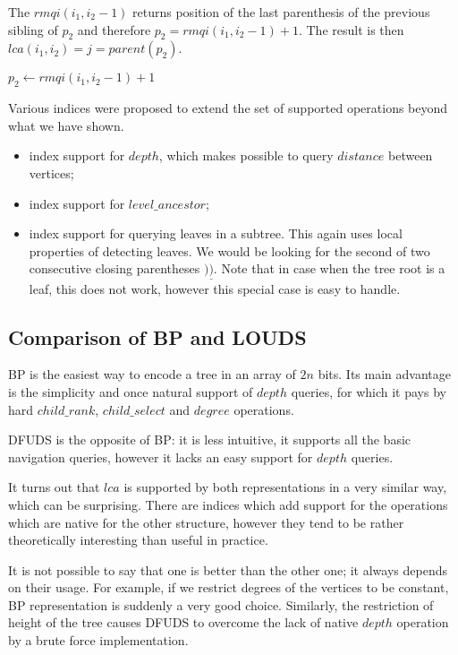 The $rmqi(i_1, i_2 - 1)$ returns position of the last parenthesis of the previous sibling of $p_2$ and therefore $p_2 = rmqi(i_1, i_2 - 1) + 1$.
The result is then $lca(i_1, i_2) = j = parent(p_2)$.

\begin{algorithmic}
		\State {}
		\State {}
	\Else
		\State $p_2 \gets rmqi(i_1, i_2 - 1) + 1$
		\State {}
	\EndIf
\EndFunction
\end{algorithmic}

\bigskip

Various indices were proposed to extend the set of supported operations beyond what we have shown.
\begin{itemize}
	\item index support for $depth$, which makes possible to query $distance$ between vertices;
	\item index support for $level\_ancestor$;
	\item index support for querying leaves in a subtree.
	This again uses local properties of detecting leaves.
	We would be looking for the second of two consecutive closing parentheses $)\underline{)}$.
	Note that in case when the tree root is a leaf, this does not work, however this special case is easy to handle.
\end{itemize}

\subsection{Comparison of BP and LOUDS}

BP is the easiest way to encode a tree in an array of $2n$ bits.
Its main advantage is the simplicity and once natural support of $depth$ queries, for which it pays by hard $child\_rank$, $child\_select$ and $degree$ operations.

DFUDS is the opposite of BP: it is less intuitive, it supports all the basic navigation queries, however it lacks an easy support for $depth$ queries.

It turns out that $lca$ is supported by both representations in a very similar way, which can be surprising.
There are indices which add support for the operations which are native for the other structure, however they tend to be rather theoretically interesting than useful in practice. 

It is not possible to say that one is better than the other one; it always depends on their usage.
For example, if we restrict degrees of the vertices to be constant, BP representation is suddenly a very good choice.
Similarly, the restriction of height of the tree causes DFUDS to overcome the lack of native $depth$ operation by a brute force implementation.